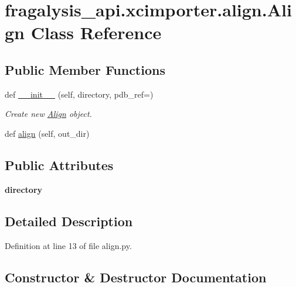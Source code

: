 \hypertarget{classfragalysis__api_1_1xcimporter_1_1align_1_1_align}{}\section{fragalysis\+\_\+api.\+xcimporter.\+align.\+Align Class Reference}
\label{classfragalysis__api_1_1xcimporter_1_1align_1_1_align}
\subsection*{Public Member Functions}
\begin{DoxyCompactItemize}
\item 
def \hyperlink{classfragalysis__api_1_1xcimporter_1_1align_1_1_align_a28e5edc1a05680d36665012eff20a271}{\+\_\+\+\_\+init\+\_\+\+\_\+} (self, directory, pdb\+\_\+ref=\textquotesingle{}\textquotesingle{})
\begin{DoxyCompactList}\small\item\em Create new \hyperlink{classfragalysis__api_1_1xcimporter_1_1align_1_1_align}{Align} object. \end{DoxyCompactList}\item 
def \hyperlink{classfragalysis__api_1_1xcimporter_1_1align_1_1_align_a554c8cc5acbc9f5e86bb668c49ea1254}{align} (self, out\+\_\+dir)
\end{DoxyCompactItemize}
\subsection*{Public Attributes}
\begin{DoxyCompactItemize}
\item 
\mbox{\label{classfragalysis__api_1_1xcimporter_1_1align_1_1_align_aaa8ff46caee489ab4cab5279ac946bcc}} 
{\bfseries directory}
\end{DoxyCompactItemize}


\subsection{Detailed Description}


Definition at line 13 of file align.\+py.



\subsection{Constructor \& Destructor Documentation}
\mbox{\label{classfragalysis__api_1_1xcimporter_1_1align_1_1_align_a28e5edc1a05680d36665012eff20a271}} 
